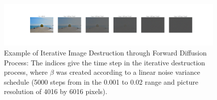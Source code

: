 \begin{figure}
    \centering
    \includegraphics[width=\textwidth]{images/forward_naoshima.png}
    \caption{Example of Iterative Image Destruction through Forward Diffusion Process:
        The indices give the time step in the iterative destruction process, where $\beta$ was created according to a linear noise variance schedule (5000 steps from in the 0.001 to 0.02 range and picture resolution of 4016 by 6016 pixels).}
\end{figure}

